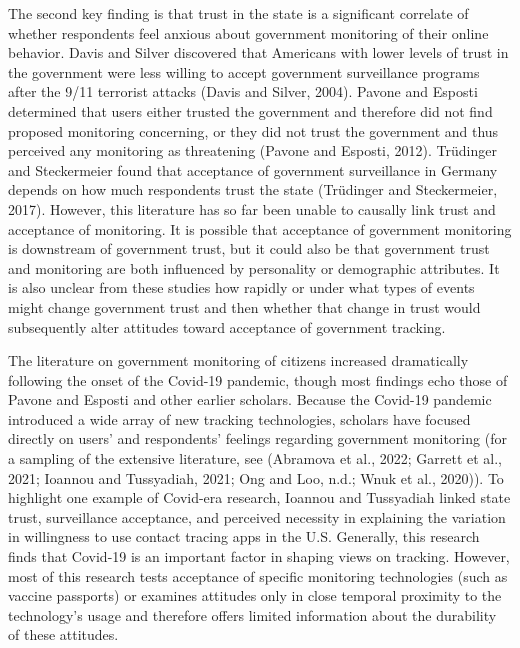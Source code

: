 \documentclass[
  letterpaper,
  DIV=11,
  numbers=noendperiod]{scrartcl}
\begin{document}
The second key finding is that trust in the state is a significant
correlate of whether respondents feel anxious about government
monitoring of their online behavior. Davis and Silver discovered that
Americans with lower levels of trust in the government were less willing
to accept government surveillance programs after the 9/11 terrorist
attacks (Davis and Silver, 2004). Pavone and Esposti determined that
users either trusted the government and therefore did not find proposed
monitoring concerning, or they did not trust the government and thus
perceived any monitoring as threatening (Pavone and Esposti, 2012).
Trüdinger and Steckermeier found that acceptance of government
surveillance in Germany depends on how much respondents trust the state
(Trüdinger and Steckermeier, 2017). However, this literature has so far
been unable to causally link trust and acceptance of monitoring. It is
possible that acceptance of government monitoring is downstream of
government trust, but it could also be that government trust and
monitoring are both influenced by personality or demographic attributes.
It is also unclear from these studies how rapidly or under what types of
events might change government trust and then whether that change in
trust would subsequently alter attitudes toward acceptance of government
tracking.

The literature on government monitoring of citizens increased
dramatically following the onset of the Covid-19 pandemic, though most
findings echo those of Pavone and Esposti and other earlier scholars.
Because the Covid-19 pandemic introduced a wide array of new tracking
technologies, scholars have focused directly on users' and respondents'
feelings regarding government monitoring (for a sampling of the
extensive literature, see (Abramova et al., 2022; Garrett et al., 2021;
Ioannou and Tussyadiah, 2021; Ong and Loo, n.d.; Wnuk et al., 2020)). To
highlight one example of Covid-era research, Ioannou and Tussyadiah
linked state trust, surveillance acceptance, and perceived necessity in
explaining the variation in willingness to use contact tracing apps in
the U.S. Generally, this research finds that Covid-19 is an important
factor in shaping views on tracking. However, most of this research
tests acceptance of specific monitoring technologies (such as vaccine
passports) or examines attitudes only in close temporal proximity to the
technology's usage and therefore offers limited information about the
durability of these attitudes.
\end{document}
